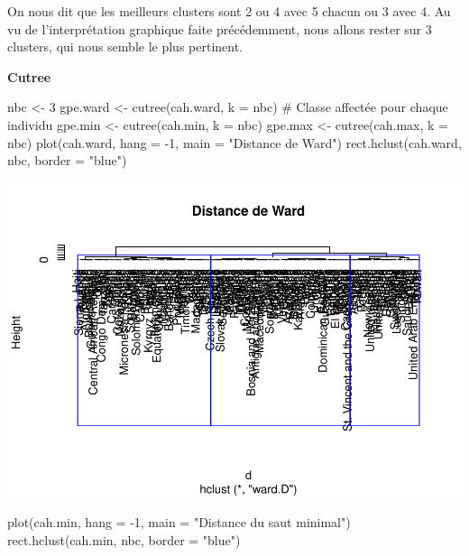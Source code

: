 \documentclass[
]{article}
\newenvironment{Shaded}{}{}
\newcommand{\AttributeTok}[1]{#1}
\newcommand{\CommentTok}[1]{\textcolor[rgb]{0.00,0.50,0.00}{#1}}
\newcommand{\DecValTok}[1]{#1}
\newcommand{\FunctionTok}[1]{#1}
\newcommand{\NormalTok}[1]{#1}
\newcommand{\OtherTok}[1]{\textcolor[rgb]{1.00,0.25,0.00}{#1}}
\newcommand{\SpecialCharTok}[1]{\textcolor[rgb]{0.00,0.50,0.50}{#1}}
\newcommand{\StringTok}[1]{\textcolor[rgb]{0.00,0.50,0.50}{#1}}
\begin{document}
On nous dit que les meilleurs clusters sont 2 ou 4 avec 5 chacun ou 3
avec 4. Au vu de l'interprétation graphique faite précédemment, nous
allons rester sur 3 clusters, qui nous semble le plus pertinent.

\textbf{Cutree}

\begin{Shaded}
\begin{Highlighting}[]
\NormalTok{nbc }\OtherTok{\textless{}{-}} \DecValTok{3}
\NormalTok{gpe.ward }\OtherTok{\textless{}{-}} \FunctionTok{cutree}\NormalTok{(cah.ward, }\AttributeTok{k =}\NormalTok{ nbc) }\CommentTok{\# Classe affectée pour chaque individu}
\NormalTok{gpe.min }\OtherTok{\textless{}{-}} \FunctionTok{cutree}\NormalTok{(cah.min, }\AttributeTok{k =}\NormalTok{ nbc)}
\NormalTok{gpe.max }\OtherTok{\textless{}{-}} \FunctionTok{cutree}\NormalTok{(cah.max, }\AttributeTok{k =}\NormalTok{ nbc)}
\FunctionTok{plot}\NormalTok{(cah.ward, }\AttributeTok{hang =} \SpecialCharTok{{-}}\DecValTok{1}\NormalTok{, }\AttributeTok{main =} \StringTok{"Distance de Ward"}\NormalTok{)}
\FunctionTok{rect.hclust}\NormalTok{(cah.ward, nbc, }\AttributeTok{border =} \StringTok{"blue"}\NormalTok{)}
\end{Highlighting}
\end{Shaded}

\includegraphics{Projet_files/figure-latex/unnamed-chunk-20-1.pdf}

\begin{Shaded}
\begin{Highlighting}[]
\FunctionTok{plot}\NormalTok{(cah.min, }\AttributeTok{hang =} \SpecialCharTok{{-}}\DecValTok{1}\NormalTok{, }\AttributeTok{main =} \StringTok{"Distance du saut minimal"}\NormalTok{)}
\FunctionTok{rect.hclust}\NormalTok{(cah.min, nbc, }\AttributeTok{border =} \StringTok{"blue"}\NormalTok{)}
\end{Highlighting}
\end{Shaded}
\end{document}

